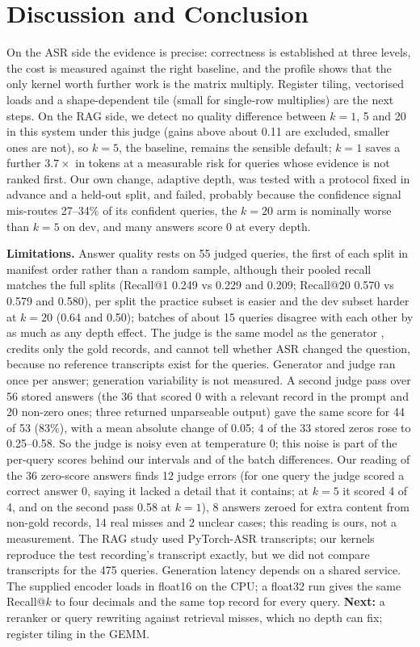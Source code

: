 \documentclass{article}
\begin{document}
\section{Discussion and Conclusion}
\label{sec:conclusion}

On the ASR side the evidence is precise: correctness is established at three levels, the cost is measured against the right baseline, and the profile shows that the only kernel worth further work is the matrix multiply. Register tiling, vectorised loads and a shape-dependent tile (small for single-row multiplies) are the next steps. On the RAG side, we detect no quality difference between $k=1$, 5 and 20 in this system under this judge (gains above about 0.11 are excluded, smaller ones are not), so $k=5$, the baseline, remains the sensible default; $k=1$ saves a further $3.7\times$ in tokens at a measurable risk for queries whose evidence is not ranked first. Our own change, adaptive depth, was tested with a protocol fixed in advance and a held-out split, and failed, probably because the confidence signal mis-routes 27--34\% of its confident queries, the $k=20$ arm is nominally worse than $k=5$ on dev, and many answers score 0 at every depth.

\textbf{Limitations.} Answer quality rests on 55 judged queries, the first of each split in manifest order rather than a random sample, although their pooled recall matches the full splits (Recall@1 0.249 vs 0.229 and 0.209; Recall@20 0.570 vs 0.579 and 0.580), per split the practice subset is easier and the dev subset harder at $k=20$ (0.64 and 0.50); batches of about 15 queries disagree with each other by as much as any depth effect. The judge is the same model as the generator \citep{zheng2023judging}, credits only the gold records, and cannot tell whether ASR changed the question, because no reference transcripts exist for the queries. Generator and judge ran once per answer; generation variability is not measured. A second judge pass over 56 stored answers (the 36 that scored 0 with a relevant record in the prompt and 20 non-zero ones; three returned unparseable output) gave the same score for 44 of 53 (83\%), with a mean absolute change of 0.05; 4 of the 33 stored zeros rose to 0.25--0.58. So the judge is noisy even at temperature 0; this noise is part of the per-query scores behind our intervals and of the batch differences. Our reading of the 36 zero-score answers finds 12 judge errors (for one query the judge scored a correct answer 0, saying it lacked a detail that it contains; at $k=5$ it scored 4 of 4, and on the second pass 0.58 at $k=1$), 8 answers zeroed for extra content from non-gold records, 14 real misses and 2 unclear cases; this reading is ours, not a measurement. The RAG study used PyTorch-ASR transcripts; our kernels reproduce the test recording's transcript exactly, but we did not compare transcripts for the 475 queries. Generation latency depends on a shared service. The supplied encoder loads in float16 on the CPU; a float32 run gives the same Recall@$k$ to four decimals and the same top record for every query. \textbf{Next:} a reranker or query rewriting against retrieval misses, which no depth can fix; register tiling in the GEMM.
\end{document}
